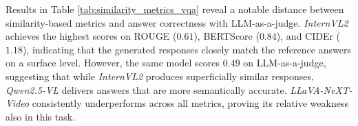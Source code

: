 \begin{table*}[h]
 \caption{\label{tab:tasks_consistency_threshold8}
    Aggregate accuracy on Task $1$ and Task $2$ on Qwen-2.5-VL across reasoning categories.
  }
\end{table*}


Results in Table  \ref{tab:similarity_metrics_vqa}  reveal a notable distance between  similarity-based metrics and answer correctness  with LLM-as-a-judge. \textit{InternVL2} achieves the highest scores on ROUGE ($0.61$), BERTScore ($0.84$),  and CIDEr ($1.18$), indicating that the generated responses closely match the reference answers on a surface level. However, the same model scores $0.49$ on LLM-as-a-judge, suggesting that while \textit{InternVL2} produces superficially similar responses, \textit{Qwen2.5-VL} delivers answers that are more semantically accurate. 
\textit{LLaVA-NeXT-Video} consistently underperforms across all metrics, proving its relative weakness also in this task. 

